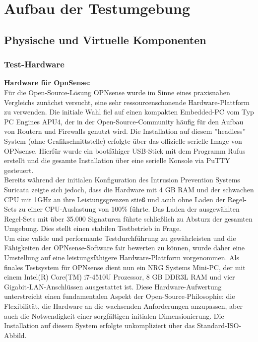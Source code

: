 \chapter{Aufbau der Testumgebung}
\section{Physische und Virtuelle Komponenten}
\subsection{Test-Hardware}
\textbf{Hardware für OpnSense:}\\
Für die Open-Source-Lösung OPNsense wurde im Sinne eines praxisnahen Vergleichs zunächst versucht, eine sehr ressourcenschonende Hardware-Plattform zu verwenden. Die initiale Wahl fiel auf einen kompakten Embedded-PC vom Typ PC Engines APU4, der in der Open-Source-Community häufig für den Aufbau von Routern und Firewalls genutzt wird. Die Installation auf diesem ''headless'' System (ohne Grafikschnittstelle) erfolgte über das offizielle serielle Image von OPNsense. Hierfür wurde ein bootfähiger USB-Stick mit dem Programm Rufus erstellt und die gesamte Installation über eine serielle Konsole via PuTTY gesteuert.\\

Bereits während der initialen Konfiguration des Intrusion Prevention Systems Suricata zeigte sich jedoch, dass die Hardware mit 4 GB RAM und der schwachen CPU mit 1GHz an ihre Leistungsgrenzen stieß und acuh ohne Laden der Regel-Sets zu einer CPU-Auslastung von 100\% führte. Das Laden der ausgewählten Regel-Sets mit über 35.000 Signaturen führte schließlich zu Absturz der gesamten Umgebung. Dies stellt einen stabilen Testbetrieb in Frage.\\

Um eine valide und performante Testdurchführung zu gewährleisten und die Fähigkeiten der OPNsense-Software fair bewerten zu können, wurde daher eine Umstellung auf eine leistungsfähigere Hardware-Plattform vorgenommen. Als finales Testsystem für OPNsense dient nun ein NRG Systems Mini-PC, der mit einem Intel(R) Core(TM) i7-4510U Prozessor, 8 GB DDR3L RAM und vier Gigabit-LAN-Anschlüssen ausgestattet ist. Diese Hardware-Aufwertung unterstreicht einen fundamentalen Aspekt der Open-Source-Philosophie: die Flexibilität, die Hardware an die wachsenden Anforderungen anzupassen, aber auch die Notwendigkeit einer sorgfältigen initialen Dimensionierung. Die Installation auf diesem System erfolgte unkompliziert über das Standard-ISO-Abbild.\\

